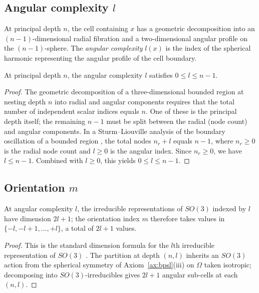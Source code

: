 \subsection{Angular complexity $l$}

\begin{definition}
\label{def:angular}
At principal depth $n$, the cell containing $x$ has a geometric decomposition into an $(n-1)$-dimensional radial fibration and a two-dimensional angular profile on the $(n-1)$-sphere. The \emph{angular complexity} $l(x)$ is the index of the spherical harmonic representing the angular profile of the cell boundary.
\end{definition}

\begin{lemma}
\label{lem:langeconstraint}
At principal depth $n$, the angular complexity $l$ satisfies $0\le l\le n-1$.
\end{lemma}
\begin{proof}
The geometric decomposition of a three-dimensional bounded region at nesting depth $n$ into radial and angular components requires that the total number of independent scalar indices equals $n$. One of these is the principal depth itself; the remaining $n-1$ must be split between the radial (node count) and angular components. In a Sturm--Liouville analysis of the boundary oscillation of a bounded region \citep{arfkenweber2005}, the total nodes $n_{r}+l$ equals $n-1$, where $n_{r}\ge 0$ is the radial node count and $l\ge 0$ is the angular index. Since $n_{r}\ge 0$, we have $l\le n-1$. Combined with $l\ge 0$, this yields $0\le l\le n-1$.
\end{proof}

\subsection{Orientation $m$}

\begin{lemma}
\label{lem:mrange}
At angular complexity $l$, the irreducible representations of $SO(3)$ indexed by $l$ have dimension $2l+1$; the orientation index $m$ therefore takes values in $\{-l,-l+1,\ldots,+l\}$, a total of $2l+1$ values.
\end{lemma}
\begin{proof}
This is the standard dimension formula for the $l$th irreducible representation of $SO(3)$ \citep{wigner1959,sakurai2017}. The partition at depth $(n,l)$ inherits an $SO(3)$ action from the spherical symmetry of Axiom~\ref{ax:bpsl}(iii) on $\Omega$ taken isotropic; decomposing into $SO(3)$-irreducibles gives $2l+1$ angular sub-cells at each $(n,l)$.
\end{proof}

